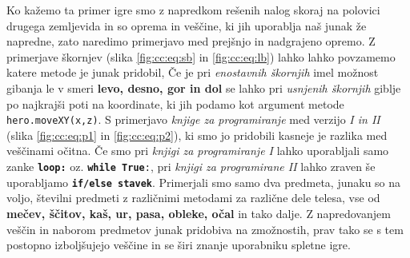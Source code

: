  Ko kažemo ta primer igre smo z napredkom rešenih nalog skoraj na
 polovici drugega zemljevida in so oprema in veščine, ki jih uporablja
 naš junak že napredne, zato naredimo primerjavo med prejšnjo in
 nadgrajeno opremo. Z primerjave škornjev (slika \ref{fig:cc:eq:sb} in
 \ref{fig:cc:eq:lb}) lahko lahko povzamemo katere metode je junak
 pridobil, Če je pri \emph{enostavnih škornjih} imel možnost gibanja
 le v smeri \textbf{levo, desno, gor in dol} se lahko pri
 \emph{usnjenih škornjih} giblje po najkrajši poti na koordinate, ki
 jih podamo kot argument metode \texttt{hero.moveXY(x,z)}. S
 primerjavo \emph{knjige za programiranje} med verzijo \emph{I in II}
 (slika \ref{fig:cc:eq:p1} in \ref{fig:cc:eq:p2}), ki smo jo pridobili
 kasneje je razlika med veščinami očitna. Če smo pri \emph{knjigi za
   programiranje I} lahko uporabljali samo zanke
 \texttt{\textbf{loop:}} oz. \texttt{\textbf{while True}:}, pri
 \emph{knjigi za programirane II} lahko zraven še uporabljamo
 \texttt{\textbf{if/else stavek}}. Primerjali smo samo dva predmeta,
 junaku so na voljo, številni predmeti z različnimi metodami za
 različne dele telesa, vse od \textbf{mečev, ščitov, kaš, ur, pasa,
   obleke, očal} in tako dalje. Z napredovanjem veščin in naborom
 predmetov junak pridobiva na zmožnostih, prav tako se s tem postopno
 izboljšujejo veščine in se širi znanje uporabniku spletne igre.

